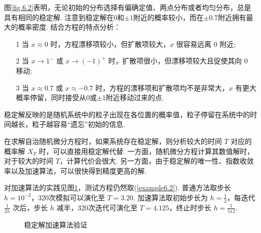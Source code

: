 图\ref{fig.6.2}表明，无论初始的分布选择有偏确定值、两点分布或者均匀分布，总是具有相同的稳定解. 注意到稳定解在0和$\pm1$附近的概率较小，而在$\pm0.7$附近拥有最大的概率密度. 结合方程的特点分析：
\begin{enumerate}
	\item[1] 当 $x\approx 0$ 时，方程漂移项较小，但扩散项较大，$x$ 很容易远离 $0$ 附近;
	\item[2] 当 $x\to 1^-$ 或 $x\to (-1)^+$ 时，扩散项很小，但漂移项较大且促使其向 0 移动;
	\item[3] 当 $x\approx 0.7$ 或 $x\approx -0.7$ 时，方程的漂移项和扩散项均不是非常大，$x$ 有更大概率停留，同时接受从0或$\pm1$附近移动过来的点. 
\end{enumerate}
稳定解反映的是随机系统中的粒子出现在各位置的概率值，粒子停留在系统中的时间越长，粒子越容易“遗忘”初始的信息. 

在求解自治随机微分方程时，如果系统存在稳定解，则分析较大的时间 $T$ 对应的概率解 $X_T$ 时，可以直接用稳定解代替. 一方面，随机微分方程计算其数值解时，对于较大的时间 $T$，计算代价会很大. 另一方面，由于稳定解的唯一性、指数收敛率以及加速算法，可以很快得到精度更高的解. 

对加速算法的实践见图\ref{fig.6.3}，测试方程仍然取(\ref{example6.2}). 普通方法取步长 $h=10^{-2}$，320次模拟可以演化至 $T=3.20$. 加速算法取初始步长为 $h = \frac12$，每迭代 $\frac1{2h}$ 次后，步长 $h$ 减半，320次迭代可演化至 $T=4.125$，终止时步长 $h=\frac1{512}$. 
\begin{figure}[!htbp]
	\centering 
	\vspace{.2cm}
	\caption{稳定解加速算法验证}
	\label{fig.6.3}
\end{figure}

